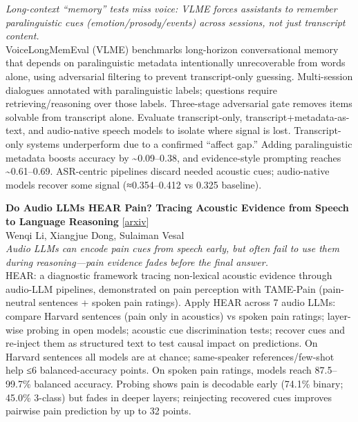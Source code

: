 \documentclass[12pt,letterpaper]{article}
\begin{document}
{\small\textit{Long-context ``memory'' tests miss voice: VLME forces assistants to remember paralinguistic cues (emotion/prosody/events) across sessions, not just transcript content.}}\\[1pt]
{\footnotesize VoiceLongMemEval (VLME) benchmarks long-horizon conversational memory that depends on paralinguistic metadata intentionally unrecoverable from words alone, using adversarial filtering to prevent transcript-only guessing. Multi-session dialogues annotated with paralinguistic labels; questions require retrieving/reasoning over those labels. Three-stage adversarial gate removes items solvable from transcript alone. Evaluate transcript-only, transcript+metadata-as-text, and audio-native speech models to isolate where signal is lost. Transcript-only systems underperform due to a confirmed ``affect gap.'' Adding paralinguistic metadata boosts accuracy by \textasciitilde{}0.09--0.38, and evidence-style prompting reaches \textasciitilde{}0.61--0.69. ASR-centric pipelines discard needed acoustic cues; audio-native models recover some signal (≈0.354--0.412 vs 0.325 baseline).}

\medskip

{\small\textbf{Do Audio LLMs HEAR Pain? Tracing Acoustic Evidence from Speech to Language Reasoning}} {\scriptsize[\href{https://arxiv.org/abs/2610.38570}{arxiv}]}\\
{\scriptsize Wenqi Li, Xiangjue Dong, Sulaiman Vesal}\\

{\small\textit{Audio LLMs can encode pain cues from speech early, but often fail to use them during reasoning---pain evidence fades before the final answer.}}\\[1pt]
{\footnotesize HEAR: a diagnostic framework tracing non-lexical acoustic evidence through audio-LLM pipelines, demonstrated on pain perception with TAME-Pain (pain-neutral sentences + spoken pain ratings). Apply HEAR across 7 audio LLMs: compare Harvard sentences (pain only in acoustics) vs spoken pain ratings; layer-wise probing in open models; acoustic cue discrimination tests; recover cues and re-inject them as structured text to test causal impact on predictions. On Harvard sentences all models are at chance; same-speaker references/few-shot help ≤6 balanced-accuracy points. On spoken pain ratings, models reach 87.5--99.7\% balanced accuracy. Probing shows pain is decodable early (74.1\% binary; 45.0\% 3-class) but fades in deeper layers; reinjecting recovered cues improves pairwise pain prediction by up to 32 points.}
\end{document}
